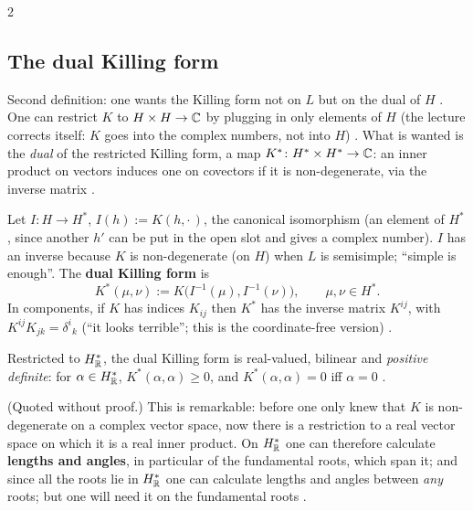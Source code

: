 \begin{paracol}{2}
\subsection{The dual Killing form}\label{sec:cl-dual}
Second definition: one wants the Killing form not on $L$ but on the dual of $H$  . One can restrict $K$ to $H\times H\to\mathbb{C}$ by plugging in only elements of $H$ (the lecture corrects itself: $K$ goes into the complex numbers, not into $H$)  . What is wanted is the \emph{dual} of the restricted Killing form, a map $K^*\colon H^*\times H^*\to\mathbb{C}$: an inner product on vectors induces one on covectors if it is non-degenerate, via the inverse matrix  .
\begin{definition}\label{def:cl-dual-killing}
Let $I\colon H\to H^*$, $I(h):=K(h,\cdot\,)$, the canonical isomorphism (an element of $H^*$, since another $h'$ can be put in the open slot and gives a complex number). $I$ has an inverse because $K$ is non-degenerate (on $H$) when $L$ is semisimple; ``simple is enough''. The \textbf{dual Killing form} is
\[
  K^*(\mu,\nu):=K\bigl(I^{-1}(\mu),I^{-1}(\nu)\bigr),\qquad\mu,\nu\in H^*.
\]
In components, if $K$ has indices $K_{ij}$ then $K^*$ has the inverse matrix $K^{ij}$, with $K^{ij}K_{jk}=\delta^i{}_k$ (``it looks terrible''; this is the coordinate-free version)      .
\end{definition}
\begin{theorem}\label{thm:cl-positive}
Restricted to $H^*_{\mathbb{R}}$, the dual Killing form is real-valued, bilinear and \emph{positive definite}: for $\alpha\in H^*_{\mathbb{R}}$, $K^*(\alpha,\alpha)\ge0$, and $K^*(\alpha,\alpha)=0$ iff $\alpha=0$   .
\end{theorem}
(Quoted without proof.) This is remarkable: before one only knew that $K$ is non-degenerate on a complex vector space, now there is a restriction to a real vector space on which it is a real inner product. On $H^*_{\mathbb{R}}$ one can therefore calculate \textbf{lengths and angles}, in particular of the fundamental roots, which span it; and since all the roots lie in $H^*_{\mathbb{R}}$ one can calculate lengths and angles between \emph{any} roots; but one will need it on the fundamental roots     .


\end{paracol}
